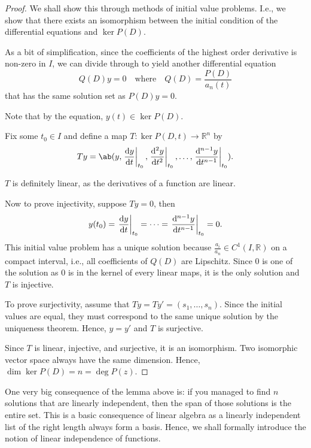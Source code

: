 \begin{proof}
  We shall show this through methods of initial value problems. I.e., we show that there exists
  an isomorphism between the initial condition of the differential equations and \(\ker P(D)\).

  As a bit of simplification, since the coefficients of the highest order derivative
  is non-zero in \(I\), we can divide through to yield another differential equation
  \begin{equation}
    Q(D)y = 0 \quad \textrm{where} \quad Q(D) = \frac{P(D)}{a_n(t)}
  \end{equation}
  that has the same solution set as \(P(D)y = 0\).

  Note that by the equation, \(y(t) \in \ker P(D)\).

  Fix some \(t_0 \in I\) and define a map \(T : \ker P(D, t) \to \mathbb{R}^n\) by
  \begin{equation}
    Ty = \ab(y, \odv{y}{t}_{t_0}, \odv[ord = 2]{y}{t}_{t_0}, \dots, \odv[ord = n - 1]{y}{t}_{t_0}).
  \end{equation}

  \(T\) is definitely linear, as the derivatives of a function are linear.

  Now to prove injectivity, suppose \(Ty = 0\), then
  \begin{equation}
    y(t_0) = \odv{y}{t}_{t_0} = \dots = \odv[ord = n - 1]{y}{t}_{t_0} = 0.
  \end{equation}
  This initial value problem has a unique solution because
  \(\frac{a_i}{a_n} \in C^1(I, \mathbb{R})\) on a compact interval, i.e., all
  coefficients of \(Q(D)\) are Lipschitz. Since \(0\) is one of the solution as \(0\)
  is in the kernel of every linear maps, it is the only solution and \(T\) is injective.

  To prove surjectivity, assume that \(Ty = Ty' = (s_1, \dots, s_n)\). Since the initial
  values are equal, they must correspond to the same unique solution by the uniqueness
  theorem. Hence, \(y = y'\) and \(T\) is surjective.

  Since \(T\) is linear, injective, and surjective, it is an isomorphism. Two isomorphic
  vector space always have the same dimension. Hence, \(\dim \ker P(D) = n = \deg P(z)\).
\end{proof}

One very big consequence of the lemma above is: if you managed to find \(n\) solutions
that are linearly independent, then the span of those solutions is the entire set. This
is a basic consequence of linear algebra as a linearly independent list of the right length always
form a basis. Hence, we shall formally introduce the notion of linear independence of functions.

